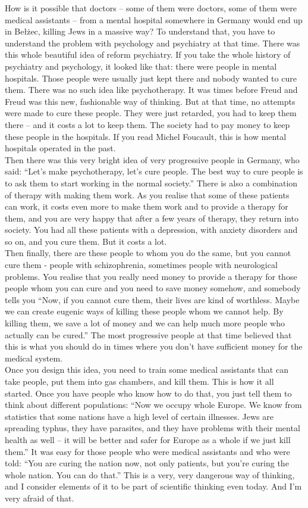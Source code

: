 How is it possible that doctors – some of them were doctors, some of them were medical assistants – from a mental hospital somewhere in Germany would end up in Bełżec, killing Jews in a massive way? To understand that, you have to understand the problem with psychology and psychiatry at that time. There was this whole beautiful idea of reform psychiatry. If you take the whole history of psychiatry and psychology, it looked like that: there were people in mental hospitals. Those people were usually just kept there and nobody wanted to cure them. There was no such idea like psychotherapy. It was times before Freud and Freud was this new, fashionable way of thinking. But at that time, no attempts were made to cure these people. They were just retarded, you had to keep them there – and it costs a lot to keep them. The society had to pay money to keep these people in the hospitals. If you read Michel Foucault, this is how mental hospitals operated in the past.\\
Then there was this very bright idea of very progressive people in Germany, who said: ``Let’s make psychotherapy, let’s cure people. The best way to cure people is to ask them to start working in the normal society.'' There is also a combination of therapy with making them work. As you realise that some of these patients can work, it costs even more to make them work and to provide a therapy for them, and you are very happy that after a few years of therapy, they return into society. You had all these patients with a depression, with anxiety disorders and so on, and you cure them. But it costs a lot.\\
Then finally, there are these people to whom you do the same, but you cannot cure them - people with schizophrenia, sometimes people with neurological problems. You realise that you really need money to provide a therapy for those people whom you can cure and you need to save money somehow, and somebody tells you ``Now, if you cannot cure them, their lives are kind of worthless. Maybe we can create eugenic ways of killing these people whom we cannot help. By killing them, we save a lot of money and we can help much more people who actually can be cured.'' The most progressive people at that time believed that this is what you should do in times where you don’t have sufficient money for the medical system.\\
Once you design this idea, you need to train some medical assistants that can take people, put them into gas chambers, and kill them. This is how it all started. Once you have people who know how to do that, you just tell them to think about different populations: ``Now we occupy whole Europe. We know from statistics that some nations have a high level of certain illnesses. Jews are spreading typhus, they have parasites, and they have problems with their mental health as well – it will be better and safer for Europe as a whole if we just kill them.'' It was easy for those people who were medical assistants and who were told: ``You are curing the nation now, not only patients, but you’re curing the whole nation. You can do that.'' This is a very, very dangerous way of thinking, and I consider elements of it to be part of scientific thinking even today. And I’m very afraid of that.

